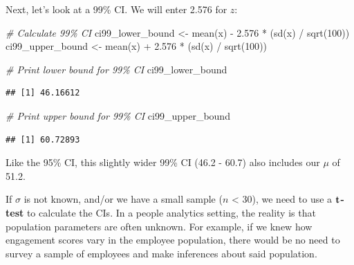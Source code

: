 \documentclass[
]{book}
\newenvironment{Shaded}{\begin{snugshade}}{\end{snugshade}}
\newcommand{\CommentTok}[1]{\textcolor[rgb]{0.56,0.35,0.01}{\textit{#1}}}
\newcommand{\DecValTok}[1]{\textcolor[rgb]{0.00,0.00,0.81}{#1}}
\newcommand{\FloatTok}[1]{\textcolor[rgb]{0.00,0.00,0.81}{#1}}
\newcommand{\FunctionTok}[1]{\textcolor[rgb]{0.00,0.00,0.00}{#1}}
\newcommand{\NormalTok}[1]{#1}
\newcommand{\OtherTok}[1]{\textcolor[rgb]{0.56,0.35,0.01}{#1}}
\newcommand{\SpecialCharTok}[1]{\textcolor[rgb]{0.00,0.00,0.00}{#1}}
\begin{document}
Next, let's look at a 99\% CI. We will enter 2.576 for \(z\):

\begin{Shaded}
\begin{Highlighting}[]
\CommentTok{\# Calculate 99\% CI}
\NormalTok{ci99\_lower\_bound }\OtherTok{\textless{}{-}} \FunctionTok{mean}\NormalTok{(x) }\SpecialCharTok{{-}} \FloatTok{2.576} \SpecialCharTok{*}\NormalTok{ (}\FunctionTok{sd}\NormalTok{(x) }\SpecialCharTok{/} \FunctionTok{sqrt}\NormalTok{(}\DecValTok{100}\NormalTok{))}
\NormalTok{ci99\_upper\_bound }\OtherTok{\textless{}{-}} \FunctionTok{mean}\NormalTok{(x) }\SpecialCharTok{+} \FloatTok{2.576} \SpecialCharTok{*}\NormalTok{ (}\FunctionTok{sd}\NormalTok{(x) }\SpecialCharTok{/} \FunctionTok{sqrt}\NormalTok{(}\DecValTok{100}\NormalTok{))}
\end{Highlighting}
\end{Shaded}

\begin{Shaded}
\begin{Highlighting}[]
\CommentTok{\# Print lower bound for 99\% CI}
\NormalTok{ci99\_lower\_bound}
\end{Highlighting}
\end{Shaded}

\begin{verbatim}
## [1] 46.16612
\end{verbatim}

\begin{Shaded}
\begin{Highlighting}[]
\CommentTok{\# Print upper bound for 99\% CI}
\NormalTok{ci99\_upper\_bound}
\end{Highlighting}
\end{Shaded}

\begin{verbatim}
## [1] 60.72893
\end{verbatim}

Like the 95\% CI, this slightly wider 99\% CI (46.2 - 60.7) also includes our \(\mu\) of 51.2.

If \(\sigma\) is not known, and/or we have a small sample (\(n\) \textless{} 30), we need to use a \(\textbf t\)\textbf{-test} to calculate the CIs. In a people analytics setting, the reality is that population parameters are often unknown. For example, if we knew how engagement scores vary in the employee population, there would be no need to survey a sample of employees and make inferences about said population.
\end{document}
